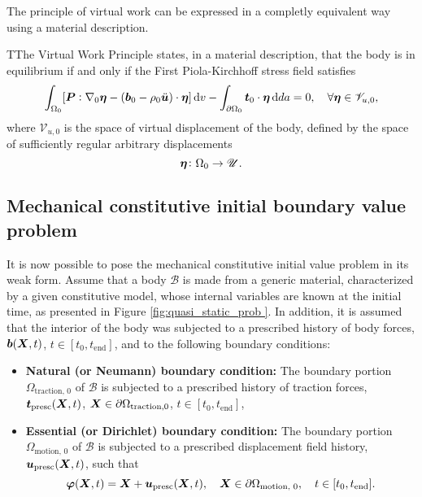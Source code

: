 The principle of virtual work can be expressed in a completly equivalent way using a material description.
\begin{problem}
TThe Virtual Work Principle states, in a material description, that the body is in equilibrium if and only if the First Piola-Kirchhoff stress field satisfies
    \begin{equation}
        \int_{\Omega_0} [\bm{P}:\nabla_0 \bm{\eta} - (\bm{b}_0 - \rho_0 \ddot{\bm u})\cdot \bm{\eta}]\,\mathrm{d} v - \int_{\partial\Omega_0} \bm{t}_0\cdot \bm{\eta}\,\mathrm{d} da = 0,\quad \forall \bm{\eta} \in \mathscr{V}_{u,0},
    \end{equation}
 where $\mathscr{V}_{u,0}$ is the space of virtual displacement of the body, defined by the space of sufficiently regular arbitrary displacements
 \begin{equation}
     \bm{\eta}\colon \Omega_0\to \mathscr{U}.
 \end{equation}
\end{problem}

\subsection{Mechanical constitutive initial boundary value problem}

It is now possible to pose the mechanical constitutive initial value problem in its weak form.
Assume that a body $\mathscr{B}$ is made from a generic material, characterized by a given constitutive model, whose internal variables are known at the initial time, as presented in Figure \ref{fig:quasi_static_prob }.
In addition, it is assumed that the interior of the body was subjected to a prescribed history of body forces, $\bm{b}(\bm X, t)$, $t\in[t_0, t_\text{end}]$, and to the following boundary conditions:
\begin{itemize}
    \item \textbf{Natural (or Neumann) boundary condition:}
    The boundary portion $\Omega_\text{traction, 0}$ of $\mathscr{B}$ is subjected to a prescribed history of traction forces, $\bm{t}_\text{presc}(\bm{X}, t)$, $\bm{X}\in \partial \Omega_\text{traction,0}$, $t\in[t_0, t_\text{end}]$,\\
    \item \textbf{Essential (or Dirichlet) boundary condition:}
    The boundary portion $\Omega_\text{motion, 0}$ of $\mathscr{B}$ is subjected to a prescribed displacement field history, $\bm{u}_\text{presc}(\bm{X}, t)$, such that $$\bm{\varphi}(\bm{X}, t) = \bm{X} + \bm{u}_\text{presc}(\bm{X}, t),\quad \bm{X}\in \partial\Omega_\text{motion, 0},\quad t\in[t_0, t_\text{end}].$$
\end{itemize}


